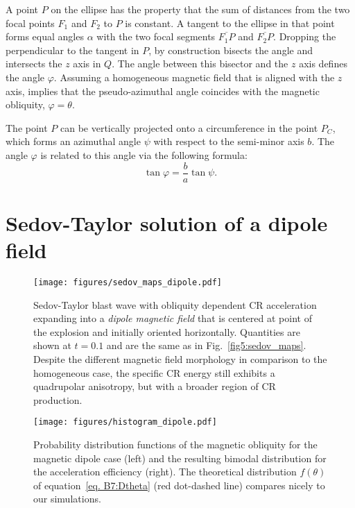 \documentclass[8pt,a4paper,usenatbib]{mnras}
\begin{document}
A point $P$ on the ellipse has the property that the sum of distances from the
two focal points $F_1$ and $F_2$ to $P$ is constant. A tangent to the ellipse in
that point forms equal angles $\alpha$ with the two focal segments
$\overline{F_1 P}$ and $\overline{F_2 P}$. Dropping the perpendicular to the
tangent in $P$, by construction bisects the angle and intersects the $z$ axis in
$Q$. The angle between this bisector and the $z$ axis defines the angle
$\varphi$. Assuming a homogeneous magnetic field that is aligned with the $z$
axis, implies that the pseudo-azimuthal angle coincides with the magnetic
obliquity, $\varphi=\theta$.

The point $P$ can be vertically projected onto a circumference in the point
$P_C$, which forms an azimuthal angle $\psi$ with respect to the semi-minor axis
$b$. The angle $\varphi$ is related to this angle via the following formula:
\begin{equation}
\tan \varphi = \dfrac{b}{a} \tan \psi   .
\end{equation}


\section{Sedov-Taylor solution of a dipole field}
\label{sec:dipole}

\begin{figure*}
\centering
\texttt{[image: figures/sedov\_maps\_dipole.pdf]}
\caption{Sedov-Taylor blast wave with obliquity dependent CR acceleration
  expanding into a {\it dipole magnetic field} that is centered at point of the
  explosion and initially oriented horizontally. Quantities are shown at $t=0.1$
  and are the same as in Fig.~\ref{fig5:sedov_maps}.  Despite the different
  magnetic field morphology in comparison to the homogeneous case, the specific
  CR energy still exhibits a quadrupolar anisotropy, but with a broader region
  of CR production.}
\label{figB1:dipole}
\end{figure*}

\begin{figure*}
\centering
\texttt{[image: figures/histogram\_dipole.pdf]}
\caption{Probability distribution functions of the magnetic obliquity for the
  magnetic dipole case (left) and the resulting bimodal distribution for the
  acceleration efficiency (right). The theoretical distribution $f(\theta)$ of
  equation~\eqref{eq. B7:Dtheta} (red dot-dashed line) compares nicely to our
  simulations.}
\label{figB2:histogram_dipole}
\end{figure*}
\end{document}
